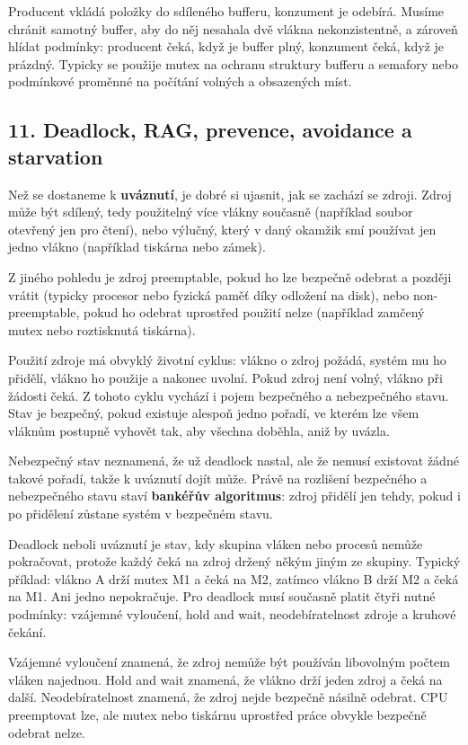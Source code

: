 \documentclass[11pt,a4paper]{article}
\begin{document}
Producent vkládá položky do sdíleného bufferu, konzument je odebírá. Musíme chránit samotný buffer, aby do něj nesahala dvě vlákna nekonzistentně, a zároveň hlídat podmínky: producent čeká, když je buffer plný, konzument čeká, když je prázdný. Typicky se použije mutex na ochranu struktury bufferu a semafory nebo podmínkové proměnné na počítání volných a obsazených míst.

\subsection*{11. Deadlock, RAG, prevence, avoidance a starvation}

Než se dostaneme k \textbf{uváznutí}, je dobré si ujasnit, jak se zachází se zdroji. Zdroj může být sdílený, tedy použitelný více vlákny současně (například soubor otevřený jen pro čtení), nebo výlučný, který v daný okamžik smí používat jen jedno vlákno (například tiskárna nebo zámek).

Z jiného pohledu je zdroj preemptable, pokud ho lze bezpečně odebrat a později vrátit (typicky procesor nebo fyzická paměť díky odložení na disk), nebo non-preemptable, pokud ho odebrat uprostřed použití nelze (například zamčený mutex nebo roztisknutá tiskárna).

Použití zdroje má obvyklý životní cyklus: vlákno o zdroj požádá, systém mu ho přidělí, vlákno ho použije a nakonec uvolní. Pokud zdroj není volný, vlákno při žádosti čeká. Z tohoto cyklu vychází i pojem bezpečného a nebezpečného stavu. Stav je bezpečný, pokud existuje alespoň jedno pořadí, ve kterém lze všem vláknům postupně vyhovět tak, aby všechna doběhla, aniž by uvázla.

Nebezpečný stav neznamená, že už deadlock nastal, ale že nemusí existovat žádné takové pořadí, takže k uváznutí dojít může. Právě na rozlišení bezpečného a nebezpečného stavu staví \textbf{bankéřův algoritmus}: zdroj přidělí jen tehdy, pokud i po přidělení zůstane systém v bezpečném stavu.

Deadlock neboli uváznutí je stav, kdy skupina vláken nebo procesů nemůže pokračovat, protože každý čeká na zdroj držený někým jiným ze skupiny. Typický příklad: vlákno A drží mutex M1 a čeká na M2, zatímco vlákno B drží M2 a čeká na M1. Ani jedno nepokračuje. Pro deadlock musí současně platit čtyři nutné podmínky: vzájemné vyloučení, hold and wait, neodebíratelnost zdroje a kruhové čekání.

Vzájemné vyloučení znamená, že zdroj nemůže být používán libovolným počtem vláken najednou. Hold and wait znamená, že vlákno drží jeden zdroj a čeká na další. Neodebíratelnost znamená, že zdroj nejde bezpečně násilně odebrat. CPU preemptovat lze, ale mutex nebo tiskárnu uprostřed práce obvykle bezpečně odebrat nelze.
\end{document}
